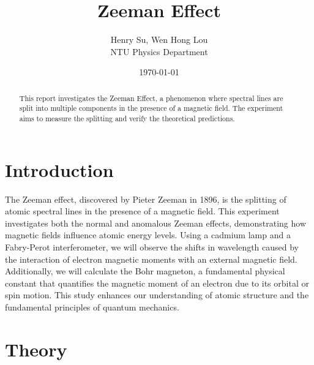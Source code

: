\documentclass[a4paper,12pt]{article}
\title{Zeeman Effect}
\author{Henry Su, Wen Hong Lou\\ NTU Physics Department}
\date{\today}
\begin{document}
\maketitle

\begin{abstract}
This report investigates the Zeeman Effect, a phenomenon where spectral lines are split into multiple components in the presence of a magnetic field. The experiment aims to measure the splitting and verify the theoretical predictions. 
\end{abstract}

\tableofcontents
\newpage

\section{Introduction}
The Zeeman effect, discovered by Pieter Zeeman in 1896, is the splitting of atomic spectral lines in the presence of a magnetic field. This experiment investigates both the normal and anomalous Zeeman effects, demonstrating how magnetic fields influence atomic energy levels. Using a cadmium lamp and a Fabry-Perot interferometer, we will observe the shifts in wavelength caused by the interaction of electron magnetic moments with an external magnetic field. Additionally, we will calculate the Bohr magneton, a fundamental physical constant that quantifies the magnetic moment of an electron due to its orbital or spin motion. This study enhances our understanding of atomic structure and the fundamental principles of quantum mechanics.\section{Theory}
\end{document}
